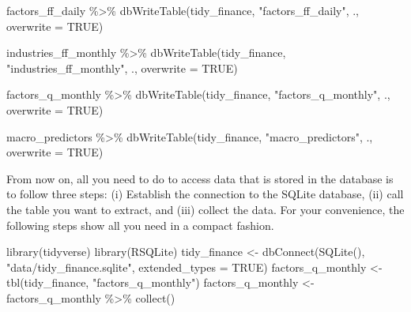 \documentclass[
]{krantz}
\newenvironment{Shaded}{\begin{snugshade}}{\end{snugshade}}
\newcommand{\AttributeTok}[1]{\textcolor[rgb]{0.61,0.61,0.61}{#1}}
\newcommand{\ConstantTok}[1]{\textcolor[rgb]{0,0,0}{#1}}
\newcommand{\FunctionTok}[1]{\textcolor[rgb]{0,0,0}{#1}}
\newcommand{\NormalTok}[1]{#1}
\newcommand{\OtherTok}[1]{\textcolor[rgb]{0.37,0.37,0.37}{#1}}
\newcommand{\SpecialCharTok}[1]{\textcolor[rgb]{0,0,0}{#1}}
\newcommand{\StringTok}[1]{\textcolor[rgb]{0.5,0.5,0.5}{#1}}
\begin{document}
\begin{Shaded}
\begin{Highlighting}[]
\NormalTok{factors\_ff\_daily }\SpecialCharTok{\%\textgreater{}\%}
  \FunctionTok{dbWriteTable}\NormalTok{(tidy\_finance, }\StringTok{"factors\_ff\_daily"}\NormalTok{, ., }\AttributeTok{overwrite =} \ConstantTok{TRUE}\NormalTok{)}

\NormalTok{industries\_ff\_monthly }\SpecialCharTok{\%\textgreater{}\%}
  \FunctionTok{dbWriteTable}\NormalTok{(tidy\_finance, }\StringTok{"industries\_ff\_monthly"}\NormalTok{, ., }\AttributeTok{overwrite =} \ConstantTok{TRUE}\NormalTok{)}

\NormalTok{factors\_q\_monthly }\SpecialCharTok{\%\textgreater{}\%}
  \FunctionTok{dbWriteTable}\NormalTok{(tidy\_finance, }\StringTok{"factors\_q\_monthly"}\NormalTok{, ., }\AttributeTok{overwrite =} \ConstantTok{TRUE}\NormalTok{)}

\NormalTok{macro\_predictors }\SpecialCharTok{\%\textgreater{}\%}
  \FunctionTok{dbWriteTable}\NormalTok{(tidy\_finance, }\StringTok{"macro\_predictors"}\NormalTok{, ., }\AttributeTok{overwrite =} \ConstantTok{TRUE}\NormalTok{)}
\end{Highlighting}
\end{Shaded}

From now on, all you need to do to access data that is stored in the database is to follow three steps: (i) Establish the connection to the SQLite database, (ii) call the table you want to extract, and (iii) collect the data. For your convenience, the following steps show all you need in a compact fashion.

\begin{Shaded}
\begin{Highlighting}[]
\FunctionTok{library}\NormalTok{(tidyverse)}
\FunctionTok{library}\NormalTok{(RSQLite)}
\NormalTok{tidy\_finance }\OtherTok{\textless{}{-}} \FunctionTok{dbConnect}\NormalTok{(}\FunctionTok{SQLite}\NormalTok{(), }\StringTok{"data/tidy\_finance.sqlite"}\NormalTok{, }
                          \AttributeTok{extended\_types =} \ConstantTok{TRUE}\NormalTok{)}
\NormalTok{factors\_q\_monthly }\OtherTok{\textless{}{-}} \FunctionTok{tbl}\NormalTok{(tidy\_finance, }\StringTok{"factors\_q\_monthly"}\NormalTok{)}
\NormalTok{factors\_q\_monthly }\OtherTok{\textless{}{-}}\NormalTok{ factors\_q\_monthly }\SpecialCharTok{\%\textgreater{}\%} \FunctionTok{collect}\NormalTok{()}
\end{Highlighting}
\end{Shaded}
\end{document}
